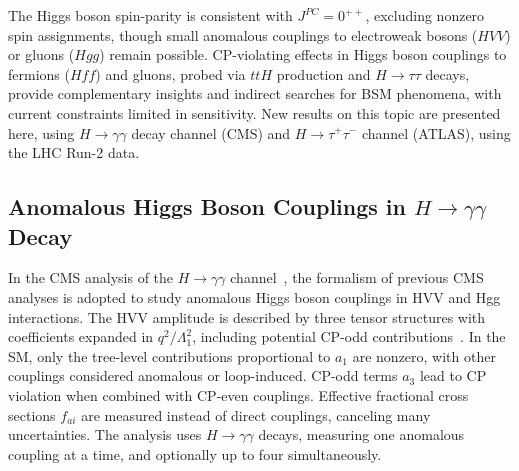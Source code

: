 \documentclass[a4paper,11pt]{article}
\begin{document}
The Higgs boson spin-parity is consistent with $J^{PC}=0^{++}$,
excluding nonzero spin assignments, though small anomalous couplings
to electroweak bosons ($HVV$) or gluons ($Hgg$) remain possible.
CP-violating effects in Higgs boson couplings to fermions ($Hff$) and
gluons, probed via $ttH$ production and $H \to \tau\tau$ decays,
provide complementary insights and indirect searches for BSM
phenomena, with current constraints limited in sensitivity.  New
results on this topic are presented here, using $H\to\gamma\gamma$ decay
channel (CMS) and $H\to\tau^+\tau^-$ channel (ATLAS), using the LHC
Run-2 data.

\subsection{Anomalous Higgs Boson Couplings in $H\to\gamma\gamma$ Decay}

In the CMS analysis of the $H \to \gamma\gamma$
channel~\cite{hggac-cms}, the formalism of previous CMS analyses is
adopted to study anomalous Higgs boson couplings in HVV and Hgg
interactions.  The HVV amplitude is described by three tensor
structures with coefficients expanded in $q^2/\Lambda^2_1$, including
potential CP-odd contributions~\cite{Gao:2010qx}. In the SM, only the
tree-level contributions proportional to $a_1$ are nonzero, with other
couplings considered anomalous or loop-induced.  CP-odd terms $a_3$
lead to CP violation when combined with CP-even couplings.  Effective
fractional cross sections $f_{ai}$ are measured instead of direct
couplings, canceling many uncertainties. The analysis uses $H \to
\gamma\gamma$ decays, measuring one anomalous coupling at a time, and
optionally up to four simultaneously.
\end{document}
